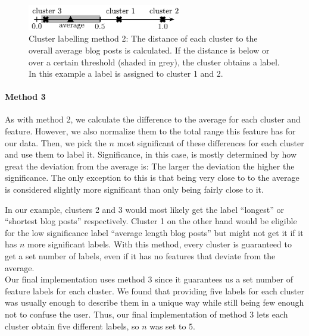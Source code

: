 \begin{figure}[ht]
	\centering
	\includegraphics[width=0.6\textwidth]{images/cluster_labeling_2.pdf}
	\caption{Cluster labelling method 2: The distance of each cluster to the overall average blog posts is calculated. If the distance is below or over a certain threshold (shaded in grey), the cluster obtains a label. In this example a label is assigned to cluster 1 and 2.}
	\label{fig:cluster_labeling_2}
\end{figure}


\paragraph{Method 3}
As with method 2, we calculate the difference to the average for each cluster and feature.
However, we also normalize them to the total range this feature has for our data.
Then, we pick the $n$ most significant of these differences for each cluster and use them to label it.
Significance, in this case, is mostly determined by how great the deviation from the average is: The larger the deviation the higher the significance.
The only exception to this is that being very close to to the average is considered slightly more significant than only being fairly close to it.

In our example, clusters 2 and 3 would most likely get the label ``longest'' or ``shortest blog posts'' respectively.
Cluster 1 on the other hand would be eligible for the low significance label ``average length blog posts'' but might not get it if it has $n$ more significant labels.
With this method, every cluster is guaranteed to get a set number of labels, even if it has no features that deviate from the average. \\


Our final implementation uses method 3 since it guarantees us a set number of feature labels for each cluster.
We found that providing five labels for each cluster was usually enough to describe them in a unique way while still being few enough not to confuse the user.
Thus, our final implementation of method 3 lets each cluster obtain five different labels, so $n$ was set to $5$.
